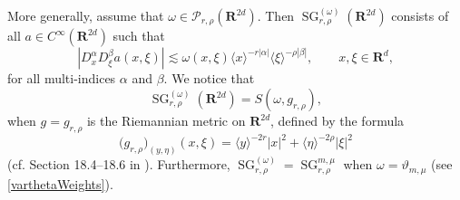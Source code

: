 \documentclass[12pt,a4paper,reqno]{amsart}
\numberwithin{equation}{section}
\numberwithin{thm}{section}
\theoremstyle{definition}
\theoremstyle{remark}
\begin{document}
More generally, assume that $\omega \in \mathscr P_{r ,\rho}
({\mathbf R^{{2d}}})$. Then ${\operatorname{SG}} _{r,\rho}^{(\omega )}({\mathbf R^{{2d}}})$ consists of all $a\in
C^\infty ({\mathbf R^{{2d}}})$ such that
\begin{equation}\label{Somegadef}
	|D_x^\alpha D_\xi ^\beta a(x,\xi)|\lesssim \omega(x,\xi){\langle x\rangle}^{-r|\alpha|}{\langle \xi\rangle} ^{-\rho|\beta|}, \qquad
        x,\xi\in {\mathbf R^{d}},
\end{equation}
for all multi-indices $\alpha$ and $\beta$. We notice that
\begin{equation}\label{SG}
{\operatorname{SG}} _{r,\rho}^{(\omega )}({\mathbf R^{{2d}}})=S(\omega ,g_{r,\rho}
),
\end{equation}
when $g=g_{r,\rho}$ is the Riemannian metric on ${\mathbf R^{{2d}}}$,
defined by the formula
\begin{equation}\label{riemannianmetric}
\big (g_{r,\rho}\big )_{(y,\eta )}(x,\xi ) ={\langle y\rangle} ^{-2r}|x|^2 +{\langle \eta\rangle} ^{-2\rho}|\xi |^2
\end{equation}
(cf. Section 18.4--18.6 in \cite{Ho1}). Furthermore, ${\operatorname{SG}} ^{(\omega
)}_{r,\rho} ={\operatorname{SG}} ^{m,\mu }_{r,\rho}$ when $\omega =\vartheta _{m,\mu}$
(see \eqref{varthetaWeights}).

\par
\end{document}
